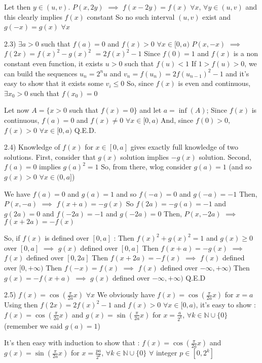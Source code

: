 \begin{solution}
Let then $ y\in(u,v)$. $ P(x,2y)$ $ \implies$ $ f(x-2y)=f(x)$ $ \forall x$, $ \forall y\in(u,v)$ and this clearly implies $ f(x)$ constant
So no such interval $ (u,v)$ exist and $ g(-x)=g(x)$ $ \forall x$

2.3) $ \exists a>0$ such that $ f(a)=0$ and $ f(x)>0$ $ \forall x\in[0,a)$
$ P(x,-x)$ $ \implies$ $ f(2x)=f(x)^2-g(x)^2$ $ =2f(x)^2-1$
Since $ f(0)=1$ and $ f(x)$ is a non constant even function, it exists $ u>0$ such that $ f(u)<1$
If $ 1>f(u)>0$, we can build the sequences $ u_n=2^nu$ and $ v_n=f(u_n)=2f(u_{n-1})^2-1$ and it's easy to show that it exists some $ v_i\leq 0$
So, since $ f(x)$ is even and continuous, $ \exists x_0>0$ such that $ f(x_0)=0$

Let now $ A=\{x>0$ such that $ f(x)=0\}$ and let $ a=\inf(A)$; Since $ f(x)$ is continuous, $ f(a)=0$ and $ f(x)\neq 0$ $ \forall x\in[0,a)$
And, since $ f(0)>0$, $ f(x)>0$ $ \forall x\in[0,a)$
Q.E.D.

2.4) Knowledge of $ f(x)$ for $ x\in[0,a]$ gives exactly full knowledge of two solutions.
First, consider that $ g(x)$ solution implies $ -g(x)$ solution.
Second, $ f(a)=0$ implies $ g(a)^2=1$ 
So, from there, wlog consider $ g(a)=1$ (and so $ g(x)>0$ $ \forall x\in(0,a]$)

We have $ f(a)=0$ and $ g(a)=1$ and so $ f(-a)=0$ and $ g(-a)=-1$
Then, $ P(x,-a)$ $ \implies$ $ f(x+a)=-g(x)$
So $ f(2a)=-g(a)=-1$ and $ g(2a)=0$ and $ f(-2a)=-1$ and $ g(-2a)=0$
Then, $ P(x,-2a)$ $ \implies$ $ f(x+2a)=-f(x)$

So, if $ f(x)$ is defined over $ [0,a]$ :
Then $ f(x)^2+g(x)^2=1$ and $ g(x)\geq 0$ over $ [0,a]$ $ \implies$ $ g(x)$ defined over $ [0,a]$
Then $ f(x+a)=-g(x)$ $ \implies$ $ f(x)$ defined  over $ [0,2a]$
Then $ f(x+2a)=-f(x)$ $ \implies$ $ f(x)$ defined  over $ [0,+\infty)$
Then $ f(-x)=f(x)$ $ \implies$ $ f(x)$ defined  over $ -\infty,+\infty)$
Then $ g(x)=-f(x+a)$ $ \implies$ $ g(x)$ defined  over $ -\infty,+\infty)$
Q.E.D

2.5) $ f(x)=\cos(\frac{\pi}{2a}x)$ $ \forall x$
We obviously have $ f(x)=\cos(\frac{\pi}{2a}x)$ for $ x=a$
Using then $ f(2x)=2f(x)^2-1$ and $ f(x)>0$ $ \forall x\in[0,a)$, it's easy to show :
$ f(x)=\cos(\frac{\pi}{2a}x)$ and $ g(x)=\sin(\frac{\pi}{2a}x)$ for $ x=\frac{a}{2^k}$, $ \forall k\in\mathbb N\cup\{0\}$ (remember we said $ g(a)=1$)

It's then easy with induction to show that :
$ f(x)=\cos(\frac{\pi}{2a}x)$ and $ g(x)=\sin(\frac{\pi}{2a}x)$ for $ x=\frac{pa}{2^k}$, $ \forall k\in\mathbb N\cup\{0\}$ $ \forall$ integer $ p\in[0,2^k]$


\end{solution}
